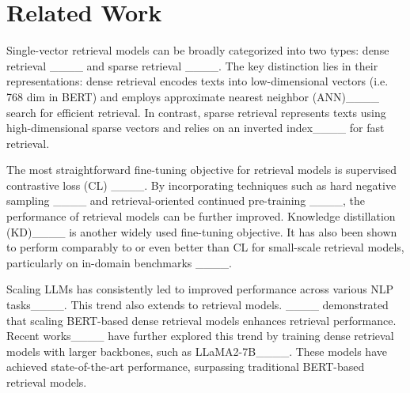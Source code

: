 \section{Related Work}
Single-vector retrieval models can be broadly categorized into two types: dense retrieval ____ and sparse retrieval ____. The key distinction lies in their representations: dense retrieval encodes texts into low-dimensional vectors (i.e. 768 dim in BERT) and employs approximate nearest neighbor (ANN)____ search for efficient retrieval. In contrast, sparse retrieval represents texts using high-dimensional sparse vectors and relies on an inverted index____ for fast retrieval. 
 
The most straightforward fine-tuning objective for retrieval models is supervised contrastive loss (CL) ____. By incorporating techniques such as hard negative sampling ____ and retrieval-oriented continued pre-training ____, the performance of retrieval models can be further improved. 
Knowledge distillation (KD)____ is another widely used fine-tuning objective. 
It has also been shown to perform comparably to or even better than CL for small-scale retrieval models, particularly on in-domain benchmarks ____.

Scaling LLMs has consistently led to improved performance across various NLP tasks____. This trend also extends to retrieval models. ____ demonstrated that scaling BERT-based dense retrieval models enhances retrieval performance.
Recent works____ have further explored this trend by training dense retrieval models with larger backbones, such as LLaMA2-7B____. These models have achieved state-of-the-art performance, surpassing traditional BERT-based retrieval models.
\vspace{-.25cm}